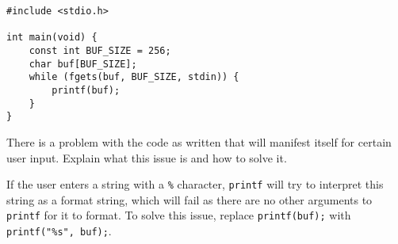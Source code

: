 \begin{verbatim}
#include <stdio.h>

int main(void) {
	const int BUF_SIZE = 256;
    char buf[BUF_SIZE];
    while (fgets(buf, BUF_SIZE, stdin)) {
        printf(buf);
    }
}
\end{verbatim}

There is a problem with the code as written that will manifest itself for certain user input. Explain what this issue is and how to solve it.

\begin{answer}
If the user enters a string with a \texttt{\%} character, \texttt{printf} will try to interpret this string as a format string, which will fail as there are no other arguments to \texttt{printf} for it to format. To solve this issue, replace \texttt{printf(buf);} with \texttt{printf("\%s", buf);}.
\end{answer}
